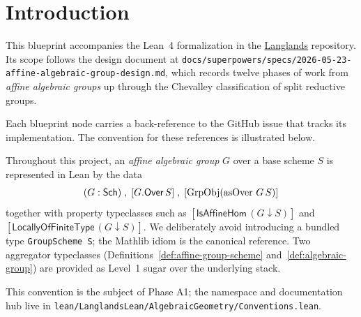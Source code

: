 \chapter{Introduction}

This blueprint accompanies the Lean~4 formalization in the
\href{https://github.com/Langlandsproject/Langlands}{Langlands} repository.
Its scope follows the design document at
\texttt{docs/superpowers/specs/2026-05-23-affine-algebraic-group-design.md},
which records twelve phases of work from \emph{affine algebraic groups} up
through the Chevalley classification of split reductive groups.

Each blueprint node carries a back-reference to the GitHub issue that tracks
its implementation. The convention for these references is illustrated below.

\begin{convention}\label{conv:typeclass-idiom}\leanok
Throughout this project, an \emph{affine algebraic group} $G$ over a base scheme $S$
is represented in Lean by the data
\[
  (G : \mathsf{Sch}) \;,\; [G.\mathsf{Over}\,S] \;,\; [\operatorname{GrpObj}(\operatorname{asOver}\,G\,S)]
\]
together with property typeclasses such as $[\mathsf{IsAffineHom}\,(G \downarrow S)]$
and $[\mathsf{LocallyOfFiniteType}\,(G \downarrow S)]$. We deliberately avoid
introducing a bundled type \texttt{GroupScheme S}; the Mathlib idiom is the
canonical reference. Two aggregator typeclasses
(Definitions~\ref{def:affine-group-scheme} and~\ref{def:algebraic-group}) are
provided as Level~1 sugar over the underlying stack.

This convention is the subject of Phase A1; the namespace and documentation
hub live in
\texttt{lean/LanglandsLean/AlgebraicGeometry/Conventions.lean}.
\end{convention}
